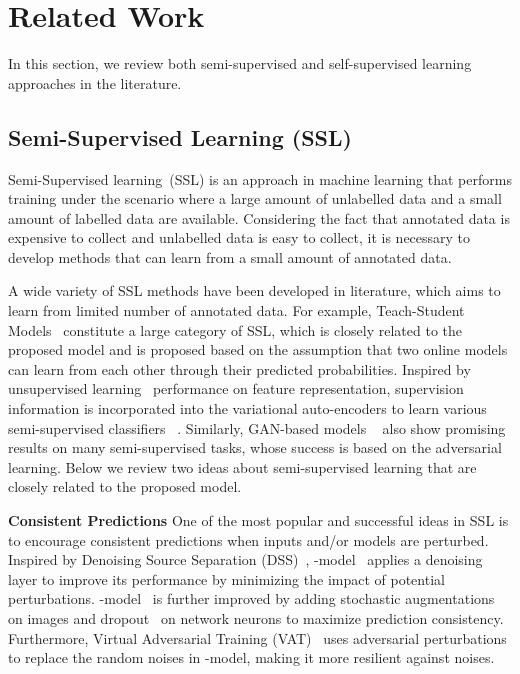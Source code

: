\documentclass[journal]{IEEEtran}
\begin{document}
\section{Related Work}
\label{sec:relatedwork}
In this section, we review both semi-supervised and self-supervised learning approaches in the literature.
\subsection{Semi-Supervised Learning (SSL)}
\par  Semi-Supervised learning~(SSL) is an approach in machine learning that performs training under the scenario where a large amount of unlabelled data and a small amount of labelled data are available.  Considering the fact that annotated data is expensive to collect and unlabelled data is easy to collect, it is necessary to develop methods that can learn from a small amount of annotated data.
\par A wide variety of SSL methods have been developed in literature, which aims to learn from limited number of annotated data. For example, Teach-Student Models~\cite{rasmus2015semi,laine2016temporal,tarvainen2017mean,miyato2018virtual} constitute a large category of SSL, which is closely related to the proposed model and is proposed based on the assumption that two online models can learn from each other through their predicted probabilities. Inspired by unsupervised learning~\cite{qi2019small,qi2016joint} performance on feature representation,  supervision information is incorporated into the variational auto-encoders to learn various semi-supervised classifiers ~\cite{kingma2014semi,narayanaswamy2017learning,maaloe2016auxiliary,sonderby2016ladder}. Similarly, GAN-based models ~\cite{qi2018global,salimans2016improved,zhao2018adversarial} also show promising results on many semi-supervised tasks, whose success is based on the adversarial learning. Below we review two ideas about semi-supervised learning that are closely related to the proposed model.
\par {\noindent\bf Consistent Predictions} One of the most popular and successful ideas in SSL is to encourage consistent predictions when inputs and/or models are perturbed. Inspired by Denoising Source Separation (DSS)~\cite{sarela2005denoising}, -model~\cite{rasmus2015semi} applies a denoising layer to improve its performance by minimizing the impact of potential perturbations. -model~\cite{laine2016temporal} is further improved by adding stochastic augmentations on images and dropout~\cite{srivastava2014dropout} on network neurons to maximize prediction consistency. Furthermore, Virtual Adversarial Training (VAT)~\cite{miyato2018virtual} uses adversarial perturbations to replace the random noises in -model, making it more resilient against noises.
\end{document}
